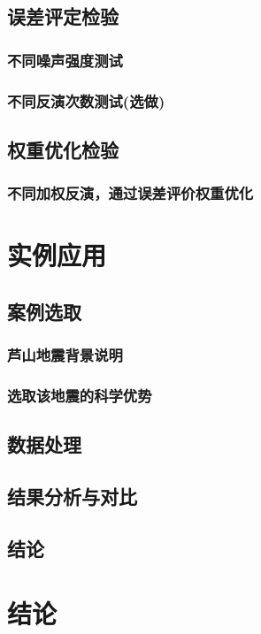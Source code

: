 \documentclass[a4paper,12pt,single,pdftex]{scrartcl}
\begin{document}
\label{ID_146378205}\subsection{误差评定检验}

\label{ID_1408987114}\subsubsection{不同噪声强度测试}

\label{ID_74589139}\subsubsection{不同反演次数测试(选做)}

\label{ID_849140981}\subsection{权重优化检验}

\label{ID_979847281}\subsubsection{不同加权反演，通过误差评价权重优化}

\label{ID_89289087}\section{实例应用}

\label{ID_1189436416}\subsection{案例选取}

\label{ID_887518159}\subsubsection{芦山地震背景说明}

\label{ID_1205767782}\subsubsection{选取该地震的科学优势}

\label{ID_1181782570}\subsection{数据处理}

\label{ID_125212802}\subsection{结果分析与对比}

\label{ID_406104104}\subsection{结论}

\label{ID_1085563922}\section{结论}


\newpage
\end{document}
